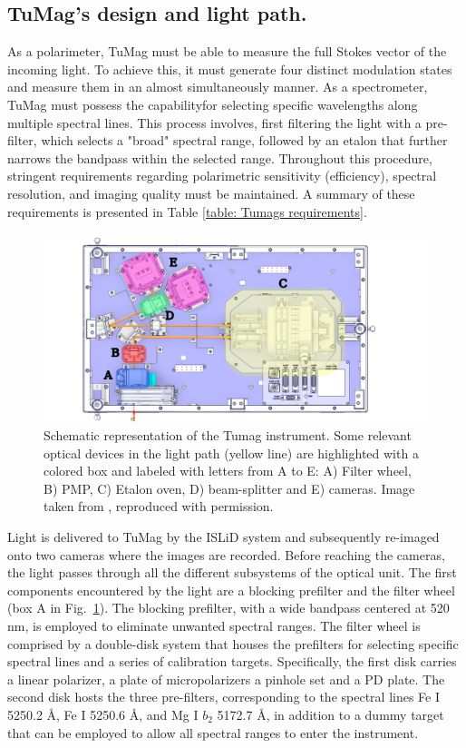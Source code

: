 \subsection{TuMag's design and light path.}

As a polarimeter, TuMag must be able to measure the full Stokes vector of the incoming light. To achieve this, it must generate four distinct modulation states and measure them in an almost simultaneously manner. As a spectrometer, TuMag must possess the capabilityfor selecting specific wavelengths along multiple spectral lines. This process involves, first filtering the light with a pre-filter, which selects a "broad" spectral range, followed by an etalon that further narrows the bandpass within the selected range. Throughout this procedure, stringent requirements regarding polarimetric sensitivity (efficiency), spectral resolution, and imaging quality must be maintained. A summary of these requirements is presented in Table \ref{table: Tumags requirements}.

\begin{figure}[t]
    \includegraphics[width=\textwidth]{figures/TuMag/Scheme.pdf}
    \caption[Tumag schematic.]{Schematic representation of the Tumag instrument. Some relevant optical devices in the light path (yellow line) are highlighted with a colored box and labeled with letters from A to E: A) Filter wheel, B) PMP, C) Etalon oven, D) beam-splitter and E) cameras. Image taken from \cite{tumag}, reproduced with permission.      
    \label{fig_tumag:scheme}}
\end{figure}

Light is delivered to TuMag by the ISLiD system and subsequently re-imaged onto two cameras where the images are recorded. Before reaching the cameras, the light passes through all the different subsystems of the optical unit. The first components encountered by the light are a blocking prefilter and the filter wheel (box A in Fig.~\ref{fig_tumag:scheme}). The blocking prefilter, with a wide bandpass centered at 520 nm, is employed to eliminate unwanted spectral ranges. The filter wheel is comprised by a double-disk system \citep{filter-wheels} that houses the prefilters for selecting specific spectral lines and a series of calibration targets. Specifically, the first disk carries a linear polarizer, a plate of micropolarizers a pinhole set and a PD plate. The second disk hosts the three pre-filters, corresponding to the spectral lines Fe I 5250.2 \r{A}, Fe I 5250.6 \r{A}, and Mg I $b_2$ 5172.7 \r{A}, in addition to a dummy target that can be employed to allow all spectral ranges to enter the instrument.

